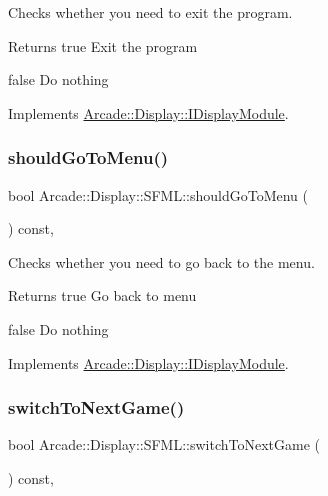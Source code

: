 Checks whether you need to exit the program. 

\begin{DoxyReturn}{Returns}
true Exit the program 

false Do nothing 
\end{DoxyReturn}


Implements \mbox{\hyperlink{classArcade_1_1Display_1_1IDisplayModule_a550877fb92d58325404b9ebe9e71f6ff}{Arcade\+::\+Display\+::\+I\+Display\+Module}}.

\mbox{\label{classArcade_1_1Display_1_1SFML_a3072fbe4dd92685154da10cbd602bc3b}} 
\subsubsection{\texorpdfstring{shouldGoToMenu()}{shouldGoToMenu()}}
{\footnotesize\ttfamily bool Arcade\+::\+Display\+::\+S\+F\+M\+L\+::should\+Go\+To\+Menu (\begin{DoxyParamCaption}{ }\end{DoxyParamCaption}) const\hspace{0.3cm}{\ttfamily [final]}, {\ttfamily [virtual]}}



Checks whether you need to go back to the menu. 

\begin{DoxyReturn}{Returns}
true Go back to menu 

false Do nothing 
\end{DoxyReturn}


Implements \mbox{\hyperlink{classArcade_1_1Display_1_1IDisplayModule_ad060f6b99f2adffaf02a4226fc40d0ab}{Arcade\+::\+Display\+::\+I\+Display\+Module}}.

\mbox{\label{classArcade_1_1Display_1_1SFML_af47adddb8c2f26b5ee0109abce03e27a}} 
\subsubsection{\texorpdfstring{switchToNextGame()}{switchToNextGame()}}
{\footnotesize\ttfamily bool Arcade\+::\+Display\+::\+S\+F\+M\+L\+::switch\+To\+Next\+Game (\begin{DoxyParamCaption}{ }\end{DoxyParamCaption}) const\hspace{0.3cm}{\ttfamily [final]}, {\ttfamily [virtual]}}



